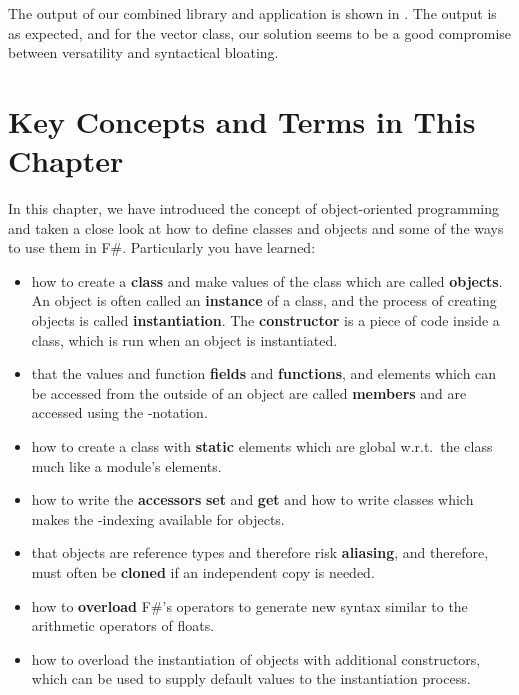 \documentclass[fsharpNotes.tex]{subfiles}
\begin{document}
The output of our combined library and application is shown in .
%
%
The output is as expected, and for the vector class, our solution seems to be a good compromise between versatility and syntactical bloating.

\section{Key Concepts and Terms in This Chapter}
In this chapter, we have introduced the concept of object-oriented programming and taken a close look at how to define classes and objects and some of the ways to use them in F\#. Particularly you have learned:
\begin{itemize}
\item how to create a \textbf{class} and make values of the class which are called \textbf{objects}. An object is often called an \textbf{instance} of a class, and the process of creating objects is called \textbf{instantiation}. The \textbf{constructor} is a piece of code inside a class, which is run when an object is instantiated.
\item that the values and function \textbf{fields} and \textbf{functions}, and elements which can be accessed from the outside of an object are called \textbf{members} and are accessed using the -notation.
\item how to create a class with \textbf{static} elements which are global w.r.t.\ the class much like a module's elements.
\item how to write the \textbf{accessors} \textbf{set} and \textbf{get} and how to write classes which makes the \lexeme{[]}-indexing available for objects.
\item that objects are reference types and therefore risk \textbf{aliasing}, and therefore, must often be \textbf{cloned} if an independent copy is needed.
\item how to \textbf{overload} F\#'s operators to generate new syntax similar to the arithmetic operators of floats.
\item how to overload the instantiation of objects with additional constructors, which can be used to supply default values to the instantiation process.
\end{itemize}
\end{document}
